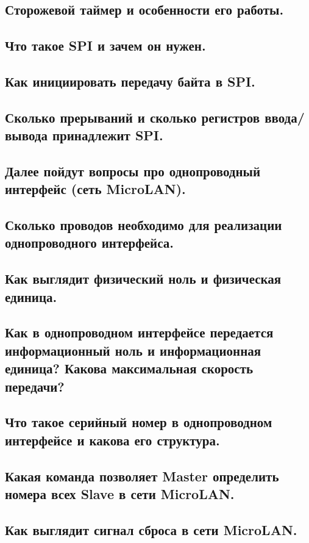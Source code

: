 \subsection{Сторожевой таймер и особенности его работы.}


\subsection{Что такое SPI и зачем он нужен.}


\subsection{Как инициировать передачу байта в SPI.}


\subsection{Сколько прерываний и сколько регистров ввода/вывода принадлежит SPI.}


\subsection{Далее пойдут вопросы про однопроводный интерфейс (сеть MicroLAN).}


\subsection{Сколько проводов необходимо для реализации однопроводного интерфейса.}


\subsection{Как выглядит физический ноль и физическая единица.}


\subsection{Как в однопроводном интерфейсе передается информационный ноль и информационная единица? Какова максимальная скорость  передачи?}


\subsection{Что такое серийный номер в однопроводном интерфейсе и какова его структура.}


\subsection{Какая команда позволяет Master определить номера всех Slave в сети MicroLAN.}


\subsection{Как выглядит сигнал сброса в сети MicroLAN.}


